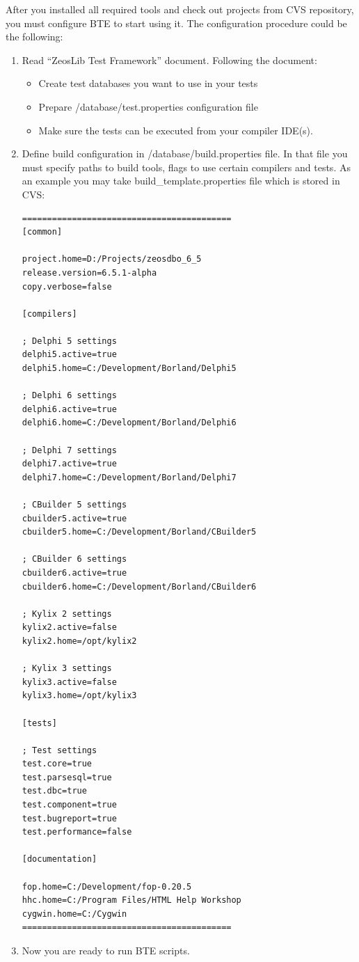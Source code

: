 \documentclass[a4paper,12pt,oneside]{book}
\begin{document}
After you installed all required tools and check out projects from CVS repository, you must configure BTE to start using it.
The configuration procedure could be the following:
\begin{enumerate}
  \item
	  Read “ZeosLib Test Framework” document.
		Following the document:
		\begin{itemize}
		  \item Create test databases you want to use in your tests
			\item Prepare /database/test.properties configuration file
			\item Make sure the tests can be executed from your compiler IDE(s).
		\end{itemize}
	\item
	  Define build configuration in /database/build.properties file.
		In that file you must specify paths to build tools, flags to use certain compilers and tests.
		As an example you may take build\_template.properties file which is stored in CVS:
		\begin{verbatim}
==========================================
[common]

project.home=D:/Projects/zeosdbo_6_5
release.version=6.5.1-alpha
copy.verbose=false

[compilers]

; Delphi 5 settings
delphi5.active=true
delphi5.home=C:/Development/Borland/Delphi5

; Delphi 6 settings
delphi6.active=true
delphi6.home=C:/Development/Borland/Delphi6

; Delphi 7 settings
delphi7.active=true
delphi7.home=C:/Development/Borland/Delphi7

; CBuilder 5 settings
cbuilder5.active=true
cbuilder5.home=C:/Development/Borland/CBuilder5

; CBuilder 6 settings
cbuilder6.active=true
cbuilder6.home=C:/Development/Borland/CBuilder6

; Kylix 2 settings
kylix2.active=false
kylix2.home=/opt/kylix2

; Kylix 3 settings
kylix3.active=false
kylix3.home=/opt/kylix3

[tests]

; Test settings
test.core=true
test.parsesql=true
test.dbc=true
test.component=true
test.bugreport=true
test.performance=false

[documentation]

fop.home=C:/Development/fop-0.20.5
hhc.home=C:/Program Files/HTML Help Workshop
cygwin.home=C:/Cygwin
==========================================
    \end{verbatim}
  \item Now you are ready to run BTE scripts.
\end{enumerate}
\end{document}
